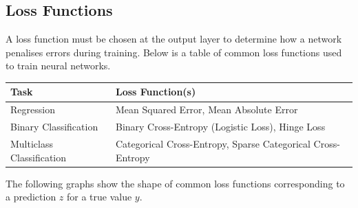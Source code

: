 \documentclass{article}
\begin{document}
\subsection{Loss Functions}
A loss function must be chosen at the output layer to determine how a
network penalises errors during training. Below is a table of common
loss functions used to train neural networks.
\begin{table}[H]
    \centering
    \begin{tabular}{ll}
        \toprule
        \textbf{Task}             & \textbf{Loss Function(s)}                                   \\
        \midrule
        Regression                & Mean Squared Error, Mean Absolute Error                     \\
        Binary Classification     & Binary Cross-Entropy (Logistic Loss), Hinge Loss            \\
        Multiclass Classification & Categorical Cross-Entropy, Sparse Categorical Cross-Entropy \\
        \bottomrule
    \end{tabular}
\end{table}
\noindent The following graphs show the shape of common loss functions
corresponding to a prediction \(z\) for a true value \(y\).
\end{document}
